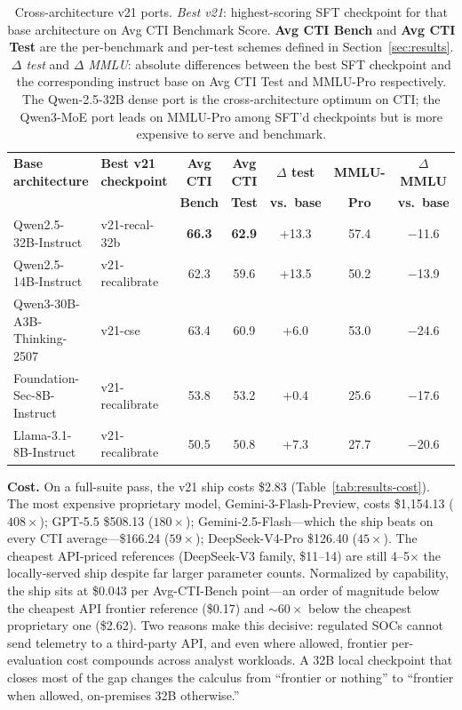 \documentclass[conference]{IEEEtran}
\begin{document}
\begin{table}[t]
\centering
\caption{Cross-architecture v21 ports. \emph{Best v21}: highest-scoring SFT checkpoint for that base architecture on Avg CTI Benchmark Score. \textbf{Avg CTI Bench} and \textbf{Avg CTI Test} are the per-benchmark and per-test schemes defined in Section~\ref{sec:results}. \emph{$\Delta$ test} and \emph{$\Delta$ MMLU}: absolute differences between the best SFT checkpoint and the corresponding instruct base on Avg CTI Test and MMLU-Pro respectively. The Qwen-2.5-32B dense port is the cross-architecture optimum on CTI; the Qwen3-MoE port leads on MMLU-Pro among SFT'd checkpoints but is more expensive to serve and benchmark.}
\label{tab:results-architectures}
\small
\setlength{\tabcolsep}{4pt}
\begin{tabular}{llccccc}
\hline
\textbf{Base architecture}  & \textbf{Best v21 checkpoint} & \textbf{Avg CTI} & \textbf{Avg CTI} & \textbf{$\Delta$ test} & \textbf{MMLU-} & \textbf{$\Delta$ MMLU} \\
                            &                              & \textbf{Bench}   & \textbf{Test}    & \textbf{vs.\ base}     & \textbf{Pro}   & \textbf{vs.\ base}     \\
\hline
Qwen2.5-32B-Instruct        & v21-recal-32b   & \textbf{66.3} & \textbf{62.9} & +13.3 & 57.4 & $-$11.6 \\
Qwen2.5-14B-Instruct        & v21-recalibrate & 62.3 & 59.6 & +13.5 & 50.2 & $-$13.9 \\
Qwen3-30B-A3B-Thinking-2507 & v21-cse         & 63.4 & 60.9 &  +6.0 & 53.0 & $-$24.6 \\
Foundation-Sec-8B-Instruct  & v21-recalibrate & 53.8 & 53.2 &  +0.4 & 25.6 & $-$17.6 \\
Llama-3.1-8B-Instruct       & v21-recalibrate & 50.5 & 50.8 &  +7.3 & 27.7 & $-$20.6 \\
\hline
\end{tabular}
\end{table}
\textbf{Cost.} On a full-suite pass, the v21 ship costs \$2.83 (Table~\ref{tab:results-cost}). The most expensive proprietary model, Gemini-3-Flash-Preview, costs \$1{,}154.13 ($408\times$); GPT-5.5 \$508.13 ($180\times$); Gemini-2.5-Flash---which the ship beats on every CTI average---\$166.24 ($59\times$); DeepSeek-V4-Pro \$126.40 ($45\times$). The cheapest API-priced references (DeepSeek-V3 family, \$11--14) are still 4--5$\times$ the locally-served ship despite far larger parameter counts. Normalized by capability, the ship sits at \$0.043 per Avg-CTI-Bench point---an order of magnitude below the cheapest API frontier reference (\$0.17) and ${\sim}60\times$ below the cheapest proprietary one (\$2.62). Two reasons make this decisive: regulated SOCs cannot send telemetry to a third-party API, and even where allowed, frontier per-evaluation cost compounds across analyst workloads. A 32B local checkpoint that closes most of the gap changes the calculus from ``frontier or nothing'' to ``frontier when allowed, on-premises 32B otherwise.''
\end{document}
